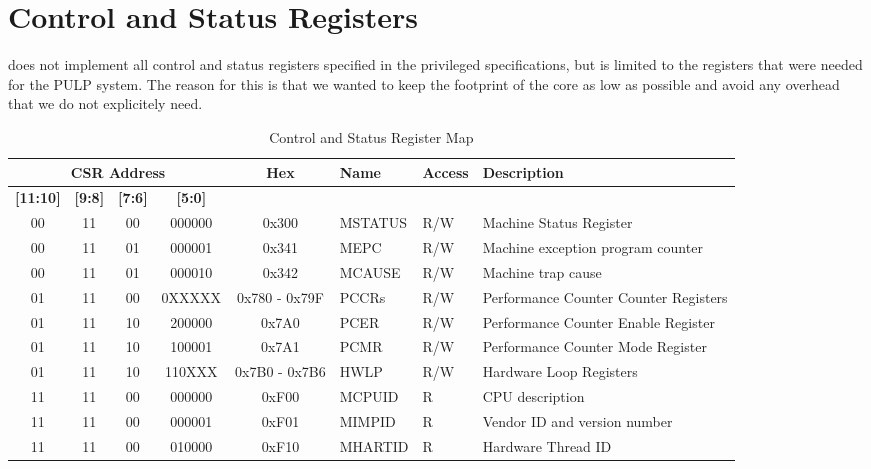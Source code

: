 \chapter{Control and Status Registers}
\label{chap:csr}

\rvcore does not implement all control and status registers specified in the
\riscv privileged specifications, but is limited to the registers that were
needed for the PULP system.
The reason for this is that we wanted to keep the footprint of the core as low
as possible and avoid any overhead that we do not explicitely need.

\begin{landscape}
\begin{table}[H]
 \caption{Control and Status Register Map}
 \label{tab:csr_map}
 \centering\begin{tabularx}{\linewidth}{@{}|cccc|c|l|l|X|@{}} \toprule
   \multicolumn{4}{|c|}{\textbf{CSR Address}} & \textbf{Hex} & \textbf{Name} & \textbf{Access}  & \textbf{Description} \\ \hline
   \textbf{[11:10]} & \textbf{[9:8]} & \textbf{[7:6]} & \textbf{[5:0]} & & & & \\ \toprule
   00 & 11 & 00 & 000000  & 0x300         & MSTATUS  & R/W & Machine Status Register \\ \hline
   00 & 11 & 01 & 000001  & 0x341         & MEPC     & R/W & Machine exception program counter \\ \hline
   00 & 11 & 01 & 000010  & 0x342         & MCAUSE   & R/W & Machine trap cause \\ \hline
   01 & 11 & 00 & 0XXXXX  & 0x780 - 0x79F & PCCRs    & R/W & Performance Counter Counter Registers \\ \hline
   01 & 11 & 10 & 200000  & 0x7A0         & PCER     & R/W & Performance Counter Enable Register \\ \hline
   01 & 11 & 10 & 100001  & 0x7A1         & PCMR     & R/W & Performance Counter Mode Register \\ \hline
   01 & 11 & 10 & 110XXX  & 0x7B0 - 0x7B6 & HWLP     & R/W & Hardware Loop Registers \\ \hline
   11 & 11 & 00 & 000000  & 0xF00         & MCPUID   & R   & CPU description  \\ \hline
   11 & 11 & 00 & 000001  & 0xF01         & MIMPID   & R   & Vendor ID and version number \\ \hline
   11 & 11 & 00 & 010000  & 0xF10         & MHARTID  & R   & Hardware Thread ID \\ \bottomrule
  \end{tabularx}
\end{table}
\end{landscape}


